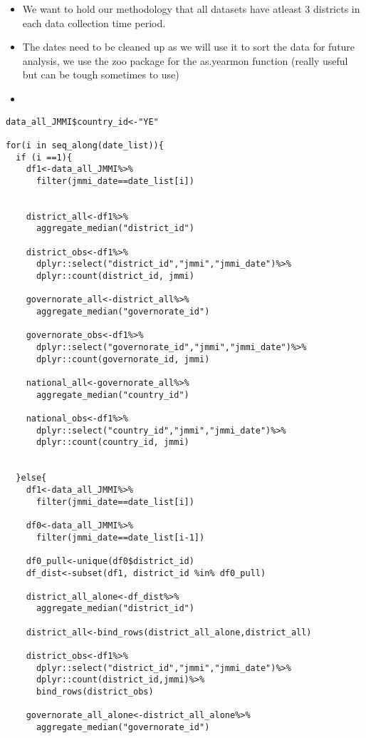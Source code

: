 \documentclass[
]{article}
\begin{document}
\begin{itemize}
\item
  We want to hold our methodology that all datasets have atleast 3
  districts in each data collection time period.
\item
  The dates need to be cleaned up as we will use it to sort the data for
  future analysis, we use the zoo package for the as.yearmon function
  (really useful but can be tough sometimes to use)
\item
\end{itemize}

\begin{verbatim}
data_all_JMMI$country_id<-"YE"

for(i in seq_along(date_list)){
  if (i ==1){
    df1<-data_all_JMMI%>%
      filter(jmmi_date==date_list[i])
    
      
    district_all<-df1%>%
      aggregate_median("district_id")
    
    district_obs<-df1%>%
      dplyr::select("district_id","jmmi","jmmi_date")%>%
      dplyr::count(district_id, jmmi)
  
    governorate_all<-district_all%>%
      aggregate_median("governorate_id")
  
    governorate_obs<-df1%>%
      dplyr::select("governorate_id","jmmi","jmmi_date")%>%
      dplyr::count(governorate_id, jmmi)
    
    national_all<-governorate_all%>%
      aggregate_median("country_id")
    
    national_obs<-df1%>%
      dplyr::select("country_id","jmmi","jmmi_date")%>%
      dplyr::count(country_id, jmmi)
    
      
  }else{
    df1<-data_all_JMMI%>%
      filter(jmmi_date==date_list[i])
    
    df0<-data_all_JMMI%>%
      filter(jmmi_date==date_list[i-1])
    
    df0_pull<-unique(df0$district_id)
    df_dist<-subset(df1, district_id %in% df0_pull)
    
    district_all_alone<-df_dist%>%
      aggregate_median("district_id")
    
    district_all<-bind_rows(district_all_alone,district_all)
    
    district_obs<-df1%>%
      dplyr::select("district_id","jmmi","jmmi_date")%>%
      dplyr::count(district_id,jmmi)%>%
      bind_rows(district_obs)
    
    governorate_all_alone<-district_all_alone%>%
      aggregate_median("governorate_id")
    

\end{verbatim}
\end{document}
